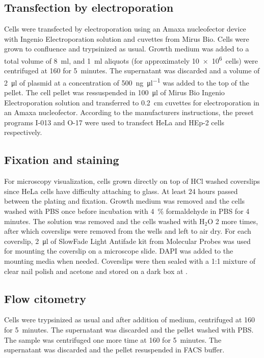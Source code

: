   \subsection{Transfection by electroporation}
    Cells were transfected by electroporation using an Amaxa nucleofector
    device with Ingenio Electroporation solution and cuvettes from Mirus Bio.
    Cells were grown to confluence and trypsinized as usual. Growth medium was
    added to a total volume of \SI{8}{\ml}, and \SI{1}{\ml} aliquots (for
    approximately \SI{10e6}{cells}) were centrifuged at \SI{160}{\gn} for 5~minutes.
    The supernatant was discarded and a volume of \SI{2}{\ul} of plasmid at
    a concentration of \SI{500}{\ng\per\ul} was added to the top of the pellet.
    The cell pellet was ressuspended in \SI{100}{\ul} of Mirus Bio Ingenio
    Electroporation solution and transferred to \SI{0.2}{\cm} cuvettes for
    electroporation in an Amaxa nucleofector. According to the manufacturers
    instructions, the preset programs I-013 and O-17 were used to transfect
    HeLa and HEp-2 cells respectively.


  \subsection{Fixation and staining}
    For microscopy visualization, cells grown directly on top of HCl washed coverslips since
    HeLa cells have difficulty attaching to glass. At least 24 hours passed
    between the plating and fixation. Growth medium was removed and the cells
    washed with PBS once before incubation with \SI{4}{\percent} formaldehyde in PBS
    for 4 minutes. The solution was removed and the cells washed with H$_2$O 2 more
    times, after which coverslips were removed from the wells and left to air dry.
    For each coverslip, \SI{2}{\ul} of SlowFade Light Antifade kit from Molecular Probes
    was used for mounting the coverslip on a microscope slide. DAPI was added
    to the mounting media when needed. Coverslips were then sealed with a 1:1
    mixture of clear nail polish and acetone and stored on a dark box at .

  \subsection{Flow citometry}

    Cells were trypsinized as usual and after addition of medium, centrifuged
    at \SI{160}{\gn} for 5~minutes. The supernatant was discarded and the
    pellet washed with PBS. The sample was centrifuged one more time at
    \SI{160}{\gn} for 5~minutes. The supernatant was discarded and the
    pellet resuspended in FACS buffer.

